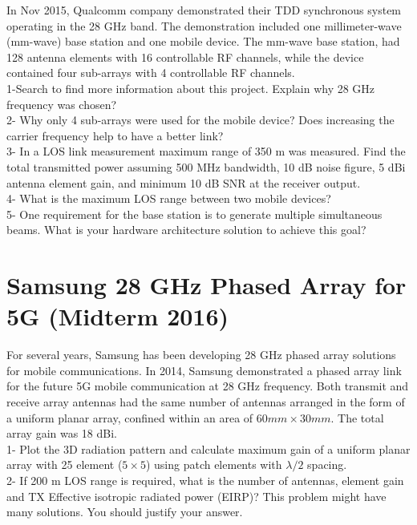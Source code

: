 \documentclass[paper=a4, fontsize=11pt]{scrartcl} %
\numberwithin{equation}{section} %
\numberwithin{figure}{section} %
\numberwithin{table}{section} %
\begin{document}
In Nov 2015, Qualcomm company demonstrated their TDD synchronous system operating in the 28 GHz band. The demonstration included one millimeter-wave (mm-wave) base station and one mobile device. The mm-wave base station, had 128 antenna elements with 16 controllable RF channels, while the device contained four sub-arrays with 4 controllable RF channels.\\

1-Search to find more information about this project. Explain why 28 GHz frequency was chosen?\\

2- Why only 4 sub-arrays were used for the mobile device? Does increasing the carrier frequency help to have a better link?\\

3- In a LOS link measurement maximum range of 350 m was measured. Find the total transmitted power assuming 500 MHz bandwidth, 10 dB noise figure, 5 dBi antenna element gain, and minimum  10 dB SNR at the receiver output.\\

4- What is the maximum LOS range between two mobile devices?\\

5- One requirement for the base station is to generate multiple simultaneous beams. What is your hardware architecture solution to achieve this goal?\\

\section{Samsung 28 GHz Phased Array for 5G (Midterm 2016)}

For several years, Samsung has been developing 28 GHz phased array solutions for mobile communications. In 2014, Samsung demonstrated a phased array link for the future 5G mobile communication at 28 GHz frequency. Both transmit and receive array antennas had the same number of antennas arranged in the form of a uniform planar array, confined within an area of $60 mm
\times 30 mm$. The total array gain was 18 dBi.\\

1- Plot the 3D radiation pattern and calculate maximum gain of a uniform planar array with 25 element ($5\times 5$) using patch elements with $\lambda/2$ spacing. \\

2- If 200 m LOS range is required, what is the number of antennas, element gain and TX Effective isotropic radiated power (EIRP)? This problem might have many solutions. You should justify your answer.\\
\end{document}
